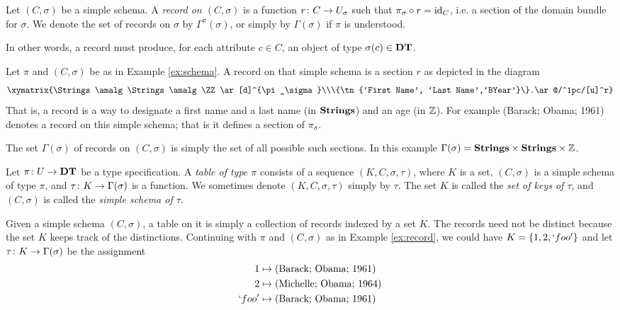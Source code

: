 \documentclass{amsart}
\begin{document}
\begin{definition}\label{def:records}

Let $(C,\sigma)$ be a simple schema.  A {\em record on $(C,\sigma)$} is a function $r\colon C\rightarrow U_\sigma$ such that $\pi_\sigma\circ r=\textnormal{id}_C$, i.e. a section of the domain bundle for $\sigma$.  We denote the set of records on $\sigma$ by $\Gamma^\pi(\sigma)$, or simply by $\Gamma(\sigma)$ if $\pi$ is understood.

\end{definition}

In other words, a record must produce, for each attribute $c\in C$, an object of type $\sigma(c)\in{\bf DT}$.  

\begin{example}\label{ex:record}

Let $\pi$ and $(C,\sigma)$ be as in Example \ref{ex:schema}.  A record on that simple schema is a section $r$ as depicted in the diagram $$\xymatrix{\Strings\amalg\Strings\amalg\ZZ\ar[d]^{\pi_\sigma}\\\{\tn{`First Name', `Last Name',`BYear'}\}.\ar@/^1pc/[u]^r}$$  That is, a record is a way to designate a first name and a last name (in ${\bf Strings}$) and an age (in ${\mathbb Z}$).  For example (Barack; Obama; 1961) denotes a record on this simple schema; that is it defines a section of $\pi_\sigma$.

The set $\Gamma(\sigma)$ of records on $(C,\sigma)$ is simply the set of all possible such sections.  In this example $\Gamma(\sigma)={\bf Strings}\times{\bf Strings}\times{\mathbb Z}$.

\end{example}

\begin{definition}\label{def:tables}

Let $\pi\colon U\rightarrow{\bf DT}$ be a type specification.  A {\em table of type $\pi$} consists of a sequence $(K,C,\sigma,\tau)$, where $K$ is a set, $(C,\sigma)$ is a simple schema of type $\pi$,  and $\tau\colon K\rightarrow\Gamma(\sigma)$ is a function.  We sometimes denote $(K,C,\sigma,\tau)$ simply by $\tau$.  The set $K$ is called the {\em set of keys of $\tau$}, and $(C,\sigma)$ is called the {\em simple schema of $\tau$}.

\end{definition}

\begin{example}\label{ex:table}

Given a simple schema $(C,\sigma)$, a table on it is simply a collection of records indexed by a set $K$.  The records need not be distinct because the set $K$ keeps track of the distinctions.  Continuing with $\pi$ and $(C,\sigma)$ as in Example \ref{ex:record}, we could have $K=\{1,2,`foo'\}$ and let $\tau\colon K\rightarrow\Gamma(\sigma)$ be the assignment \begin{align*} 1&\mapsto \textnormal{(Barack; Obama; 1961)}\\2&\mapsto \textnormal{(Michelle; Obama; 1964)}\\ `foo'&\mapsto\textnormal{(Barack; Obama; 1961)}\end{align*}

\end{example}
\end{document}

